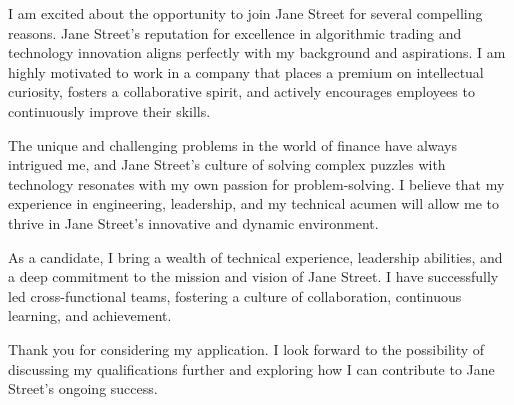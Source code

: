 \documentclass[11pt, a4paper]{awesome-cv}
\begin{document}
\begin{cvletter}
  I am excited about the opportunity to join Jane Street for several compelling
  reasons. Jane Street's reputation for excellence in algorithmic trading and
  technology innovation aligns perfectly with my background and aspirations.
  I am highly motivated to work in a company that places a premium on
  intellectual curiosity, fosters a collaborative spirit, and actively encourages
  employees to continuously improve their skills.

  The unique and challenging problems in the world of finance have always
  intrigued me, and Jane Street's culture of solving complex puzzles with
  technology resonates with my own passion for problem-solving. I believe that
  my experience in engineering, leadership, and my technical acumen
  will allow me to thrive in Jane Street's innovative and dynamic environment.

  As a candidate, I bring a wealth of technical experience,
  leadership abilities, and a deep commitment to the mission
  and vision of Jane Street. I have successfully led
  cross-functional teams, fostering a culture of collaboration,
  continuous learning, and achievement.


  Thank you for considering my application. I look forward to the possibility of
  discussing my qualifications further and exploring how I can contribute to
  Jane Street's ongoing success.

\end{cvletter}


\makeletterclosing
\end{document}
